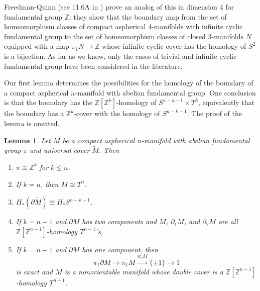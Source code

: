 \documentclass[12pt]{amsart}
\newtheorem{lemma}[theorem]{Lemma}
\theoremstyle{definition}
\newcommand{\Z}{\mathbb Z}
\newcommand{\wt}[1]{{\widetilde{#1}}}
\begin{document}
Freedman-Quinn (see 11.6A in \cite{FQ}) prove an analog of this in dimension 4 for  fundamental group $\Z$: they show that the boundary map from the set of homeomorphism classes of compact aspherical 4-manifolds with infinite cyclic fundamental group to the set of homeomorphism classes of closed 3-manifolds $N$ equipped with a map $\pi_1N \to \Z$ whose infinite cyclic cover has the homology of $S^2$ is a bijection.   As far as we know,  only the cases of trivial and infinite cyclic fundamental group have been considered in the literature.  



Our first lemma determines the possibilities for the homology of the boundary of a compact aspherical $n$-manifold with abelian fundamental group.   One conclusion is that the boundary has the  $\Z[\Z^k]$-homology of  $S^{n-k-1} \times T^k$, equivalently that the boundary has a $\Z^k$-cover with the homology of $S^{n-k-1}$.  The proof of the lemma is omitted.



\begin{lemma} \label{boundary of BZ^k} 
Let $M$ be a compact aspherical $n$-manifold with abelian fundamental group $\pi$ and universal cover $\wt M$.   Then 
\begin{enumerate}
\item $\pi \cong \Z^k$ for $k \leq n$.
\item If $k = n$, then $M \cong T^n$.
\item  $H_*(\partial \wt M) \cong H_*S^{n-k-1}$.
\item If $k = n-1$ and $\partial M$ has two components and $M$, $\partial_1M$, and $\partial_2M$ are all $\Z[\Z^{n-1}]$-homology $T^{n-1}$'s,
\item If $k = n-1$ and $\partial M$ has one component,  then
$$
\pi_1 \partial M \to \pi_1 M \xrightarrow{w_1M} \{\pm 1\} \to 1
$$
is exact and   $M$ is a nonorientable manifold whose double cover is a $\Z[\Z^{n-1}]$-homology $T^{n-1}$.
\end{enumerate}
\end{lemma}
\end{document}
